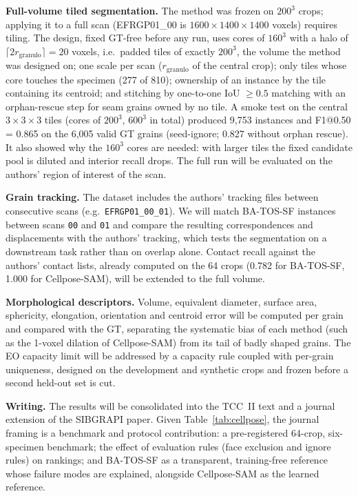 \documentclass[12pt]{article}
\newcommand{\SF}{BA-TOS-SF}
\newcommand{\CP}{Cellpose-SAM}
\newcommand{\rg}{r_{\mathrm{granulo}}}
\begin{document}
\textbf{Full-volume tiled segmentation.} The method was frozen on $200^3$ crops; applying it to a full scan
(EFRGP01\_00 is $1600\times1400\times1400$ voxels) requires tiling. The design, fixed GT-free before any run, uses
cores of $160^3$ with a halo of $\lceil 2\rg\rceil = 20$ voxels, i.e.\ padded tiles of exactly $200^3$, the volume the
method was designed on; one scale per scan ($\rg$ of the central crop); only tiles whose core touches the specimen
(277 of 810); ownership of an instance by the tile containing its centroid; and stitching by one-to-one IoU
$\ge 0.5$ matching with an orphan-rescue step for seam grains owned by no tile. A smoke test on the central
$3\times3\times3$ tiles (cores of $200^3$, $600^3$ in total) produced 9,753 instances and F1@0.50 = 0.865 on the
6,005 valid GT grains (seed-ignore; 0.827 without orphan rescue). It also showed why the $160^3$ cores are needed:
with larger tiles the fixed candidate pool is diluted and interior recall drops. The full run will be evaluated on
the authors' region of interest of the scan.

\textbf{Grain tracking.} The dataset includes the authors' tracking files between consecutive scans (e.g.\
\texttt{EFRGP01\_00\_01}). We will match \SF{} instances between scans \texttt{00} and \texttt{01} and compare the
resulting correspondences and displacements with the authors' tracking, which tests the segmentation on a
downstream task rather than on overlap alone. Contact recall against the authors' contact lists, already computed
on the 64 crops (0.782 for \SF, 1.000 for \CP), will be extended to the full volume.

\textbf{Morphological descriptors.} Volume, equivalent diameter, surface area, sphericity, elongation, orientation
and centroid error will be computed per grain and compared with the GT, separating the systematic bias of each
method (such as the 1-voxel dilation of \CP) from its tail of badly shaped grains. The EO capacity limit will be
addressed by a capacity rule coupled with per-grain uniqueness, designed on the development and synthetic crops and
frozen before a second held-out set is cut.

\textbf{Writing.} The results will be consolidated into the TCC~II text and a journal extension of the SIBGRAPI
paper. Given Table~\ref{tab:cellpose}, the journal framing is a benchmark and protocol contribution: a pre-registered
64-crop, six-specimen benchmark; the effect of evaluation rules (face exclusion and ignore rules) on rankings;
and \SF{} as a transparent, training-free reference whose failure modes are explained, alongside Cellpose-SAM as
the learned reference.



\end{document}
